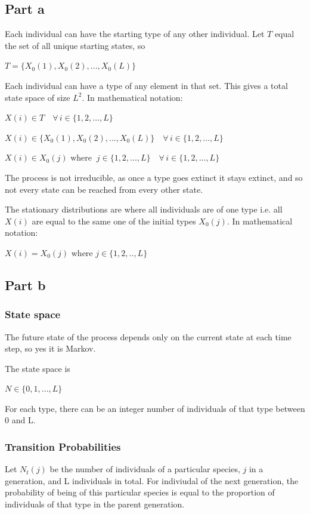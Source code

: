 \documentclass{article}
\begin{document}
\subsection{Part a}

Each individual can have the starting type of any other individual. Let $T$ equal the set of all unique starting states, so 

$T = \{X_0(1), X_0(2), . . . , X_0(L)\}$

Each individual can have a type of any element in that set. This gives a total state space of size $L^2$. In mathematical notation:

$X(i) \in T \quad \forall \, i \in \{1,2,...,L\}$ 


$X(i) \in \{X_0(1), X_0(2), . . . , X_0(L)\} \quad \forall \, i \in \{1,2,...,L\}$ 

$X(i) \in X_0(j) \text{ where } \ j \in \{1,2,...,L\} \quad \forall \, i \in\{1,2,...,L\}$ 


The process is not irreducible, as once a type goes extinct it stays extinct, and so not every state can be reached from every other state.

The stationary distributions are where all individuals are of one type i.e. all $X(i)$ are equal to the same one of the initial types $X_0(j)$. In mathematical notation:

$ X(i) = X_0(j) \text{ where } j \in \{1,2,..,L\}$

\subsection{Part b}

\subsubsection{State space}

The future state of the process depends only on the current state at each time step, so yes it is Markov. 

The state space is 

$N \in \{0,1,...,L\} $ 

For each type, there can be an integer number of individuals of that type between 0 and L. 

\subsubsection{Transition Probabilities}

Let $N_t(j)$ be the number of individuals of a particular species, $j$ in a generation, and L individuals in total. For indiviudal of the next generation, the probability of being of this particular species is equal to the proportion of individuals of that type in the parent generation. 
\end{document}
